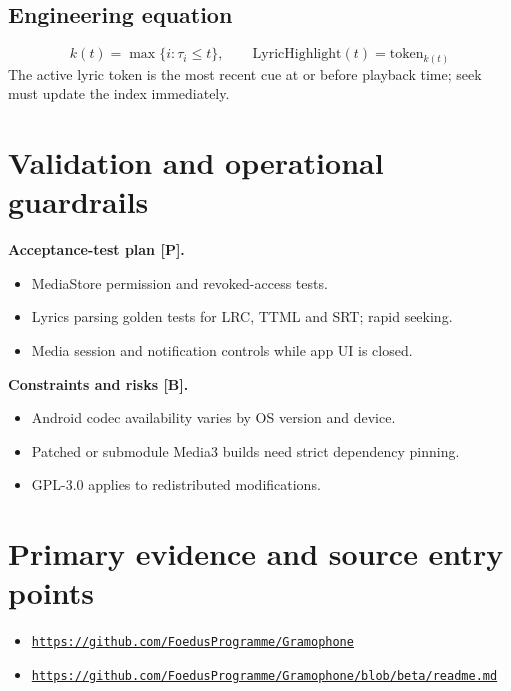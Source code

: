 \documentclass[10pt,a4paper,oneside]{report}
\newcommand{\sourceurl}[1]{\href{#1}{\texttt{\nolinkurl{#1}}}}
\begin{document}
\subsection*{Engineering equation}
\begin{equation*}k(t)=\max\{i:\tau_i\le t\},\qquad \mathrm{LyricHighlight}(t)=\mathrm{token}_{k(t)}\end{equation*}
The active lyric token is the most recent cue at or before playback time; seek must update the index immediately.\par
\section{Validation and operational guardrails}
\textbf{Acceptance-test plan [P].}\par
\begin{itemize}[leftmargin=*,itemsep=2pt,topsep=3pt]
\item MediaStore permission and revoked-access tests.
\item Lyrics parsing golden tests for LRC, TTML and SRT; rapid seeking.
\item Media session and notification controls while app UI is closed.
\end{itemize}
\textbf{Constraints and risks [B].}\par
\begin{itemize}[leftmargin=*,itemsep=2pt,topsep=3pt]
\item Android codec availability varies by OS version and device.
\item Patched or submodule Media3 builds need strict dependency pinning.
\item GPL-3.0 applies to redistributed modifications.
\end{itemize}
\section*{Primary evidence and source entry points}
\begin{itemize}[leftmargin=*,itemsep=1pt,topsep=1pt]
\item \sourceurl{https://github.com/FoedusProgramme/Gramophone}
\item \sourceurl{https://github.com/FoedusProgramme/Gramophone/blob/beta/readme.md}
\end{itemize}
\clearpage
\end{document}
